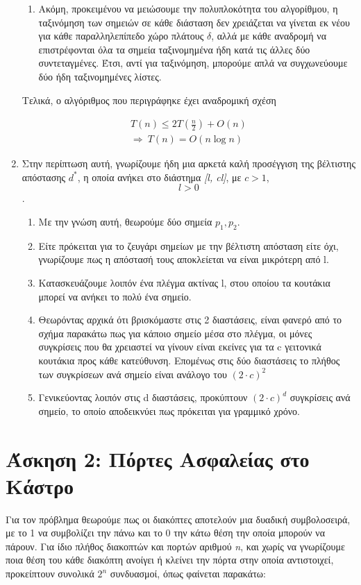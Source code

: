 \documentclass{article}
\begin{document}
\begin{enumerate}[label=(\alph*)]
\begin{enumerate}[label=(\roman*)]
	\item Ακόμη, προκειμένου να μειώσουμε την πολυπλοκότητα του αλγορίθμου, η ταξινόμηση των σημειών σε κάθε διάσταση δεν χρειάζεται να γίνεται εκ νέου για κάθε παραλληλεπίπεδο χώρο πλάτους \emph{\textlatin{$\delta$}}, αλλά με κάθε αναδρομή να επιστρέφονται όλα τα σημεία ταξινομημένα ήδη κατά τις άλλες δύο συντεταγμένες. Έτσι, αντί για ταξινόμηση, μπορούμε απλά να συγχωνεύουμε δύο ήδη ταξινομημένες λίστες. 
\end{enumerate}

Τελικά, ο αλγόριθμος που περιγράφηκε έχει αναδρομική σχέση 

\begin{align}
T(n) \leq 2T\left(\frac{n}{2}\right) + O(n) \\
\Rightarrow\ T(n) = O(n \log n)
\end{align}

\item Στην περίπτωση αυτή, γνωρίζουμε ήδη μια αρκετά καλή προσέγγιση της βέλτιστης απόστασης $d^*$, η οποία ανήκει στο διάστημα \emph{\textlatin{[l, cl]}}, με $c > 1$, $$l > 0$$. 
\begin{enumerate}[label=(\roman*)]
	\item Με την γνώση αυτή, θεωρούμε δύο σημεία \emph{\textlatin{${p_1, p_2}$}}. 	
	\item Είτε πρόκειται για το ζευγάρι σημείων με την βέλτιστη απόσταση είτε όχι, γνωρίζουμε πως η απόστασή τους αποκλείεται να είναι μικρότερη από \textlatin{l}. 
	\item Κατασκευάζουμε λοιπόν ένα πλέγμα ακτίνας \textlatin{l}, στου οποίου τα κουτάκια μπορεί να ανήκει το πολύ ένα σημείο. 
	\item Θεωρόντας αρχικά ότι βρισκόμαστε στις 2 διαστάσεις, είναι φανερό από το σχήμα παρακάτω πως για κάποιο σημείο μέσα στο πλέγμα, οι μόνες συγκρίσεις που θα χρειαστεί να γίνουν είναι εκείνες για τα c γειτονικά κουτάκια προς κάθε κατεύθυνση. Επομένως στις δύο διαστάσεις το πλήθος των συγκρίσεων ανά σημείο είναι ανάλογο του $(2 \cdot c)^2$

	\item Γενικεύοντας λοιπόν στις \textlatin{d} διαστάσεις, προκύπτουν  $(2 \cdot c)^d$ συγκρίσεις ανά σημείο, το οποίο αποδεικνύει πως πρόκειται για γραμμικό χρόνο. 
\end{enumerate}
 \end{enumerate}

\section*{\large Άσκηση 2: Πόρτες Ασφαλείας στο Κάστρο}
Για τον πρόβλημα θεωρούμε πως οι διακόπτες αποτελούν μια δυαδική συμβολοσειρά, με το 1 να συμβολίζει την πάνω και το 0 την κάτω θέση την οποία μπορούν να πάρουν. Για ίδιο πλήθος διακοπτών και πορτών αριθμού \emph{\textlatin{n}}, και χωρίς να γνωρίζουμε ποια θέση του κάθε διακόπτη ανοίγει ή κλείνει την πόρτα στην οποία αντιστοιχεί, προκείπτουν συνολικά \emph{\textlatin{${2^n}$}} συνδυασμοί, όπως φαίνεται παρακάτω: \\
\end{document}
